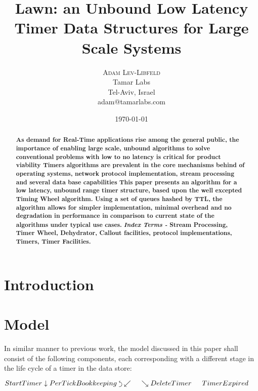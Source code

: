 \documentclass[twocolumn,a4paper]{article}
\title{Lawn: an Unbound Low Latency Timer Data Structures for Large Scale Systems}
\author{
	\textsc{Adam Lev-Libfeld} \\[1ex]
	\normalsize Tamar Labs \\
	\normalsize Tel-Aviv, Israel \\
	\normalsize{adam@tamarlabs.com}
}
\date{\today}
\newcommand{\backtrackarrow}{\rotatebox[origin=c]{-90}{$\curvearrowleft$}}
\begin{document}
\maketitle

\begin{abstract}
\textbf{\noindent As demand for Real-Time applications rise among 
the general public, the importance of enabling large scale, unbound algorithms to solve conventional problems with low to no latency is critical for product viability Timers algorithms are prevalent in the core mechanisms behind of operating systems, network protocol implementation, stream processing and several data base capabilities This paper presents an algorithm for a low latency, unbound range timer structure, based upon the well excepted Timing Wheel algorithm. Using a set of queues hashed by TTL, the algorithm allows for simpler implementation, minimal overhead and no degradation in performance in comparison to current state of the algorithms under typical use cases.}
\linebreak \linebreak
\textbf{\textit{Index Terms -} Stream Processing, Timer Wheel, Dehydrator, Callout facilities, protocol implementations, Timers, Timer Facilities.}
\end{abstract}


\section{Introduction}

\section{Model}
In similar manner to previous work\cite{TW}, the model discussed in this paper shall consist of the following components, each corresponding with a different stage in the life cycle of a timer in the data store:
\begin{center}
	$
	StartTimer \linebreak 
	\downarrow \linebreak  
	PerTickBookkeeping \hspace{1mm} \backtrackarrow \linebreak 
	\swarrow  \hspace{15pt}  \searrow \linebreak 
	DeleteTimer \hspace{15pt} TimerExpired
	$
	\vspace{3pt}
\end{center}
\end{document}
